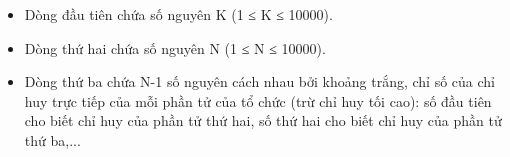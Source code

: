 \begin{itemize}
	\item Dòng đầu tiên chứa số nguyên K (1 ≤ K ≤ 10000).
	\item Dòng thứ hai chứa số nguyên N (1 ≤ N ≤ 10000).
	\item Dòng thứ ba chứa N-1 số nguyên cách nhau bởi khoảng trắng, chỉ số của chỉ huy trực tiếp của mỗi phần tử của tổ chức (trừ chỉ huy tối cao): số đầu tiên cho biết chỉ huy của phần tử thứ hai, số thứ hai cho biết chỉ huy của phần tử thứ ba,...
\end{itemize}